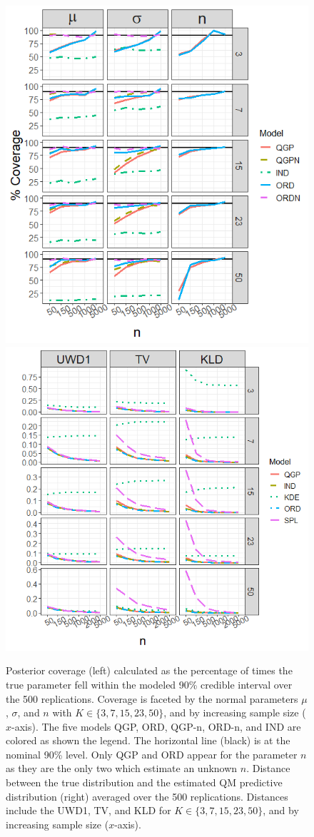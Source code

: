 \documentclass[preprint,12pt,authoryear]{elsarticle}
\begin{document}
\begin{figure}[hbt!]
  \includegraphics[width=.4\linewidth]{Images/normal_coverage.png}
  \includegraphics[width=.4\linewidth]{Images/normal_dists.png}
\caption{Posterior coverage (left) calculated as the percentage of times the true parameter fell within the modeled 90\% credible interval over the 500 replications. Coverage is faceted by the normal parameters $\mu$, $\sigma$, and $n$ with $K \in \{3, 7, 15, 23, 50\}$, and by increasing sample size ($x$-axis). The five models QGP, ORD, QGP-n, ORD-n, and IND are colored as shown the legend. The horizontal line (black) is at the nominal 90\% level. Only QGP and ORD appear for the parameter $n$ as they are the only two which estimate an unknown $n$.
Distance between the true distribution and the estimated QM predictive distribution (right) averaged over the 500 replications. Distances include the UWD1, TV, and KLD for $K \in \{3, 7, 15, 23, 50\}$, and by increasing sample size ($x$-axis).}
\label{fig:normal_cov_dists}
\end{figure}
\end{document}
